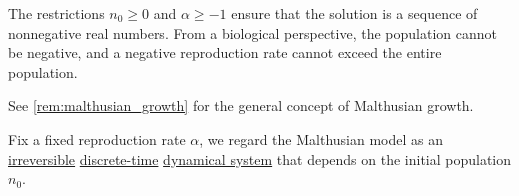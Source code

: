 \begin{comments}
  \item The restrictions \( n_0 \geq 0 \) and \( \alpha \geq -1 \) ensure that the solution is a sequence of nonnegative real numbers. From a biological perspective, the population cannot be negative, and a negative reproduction rate cannot exceed the entire population.

  See \cref{rem:malthusian_growth} for the general concept of Malthusian growth.

  \item Fix a fixed reproduction rate \( \alpha \), we regard the Malthusian model as an \hyperref[def:reversible_dynamical_system]{irreversible} \hyperref[def:discrete_dynamical_system]{discrete-time} \hyperref[def:dynamical_system]{dynamical system} that depends on the initial population \( n_0 \).
\end{comments}

